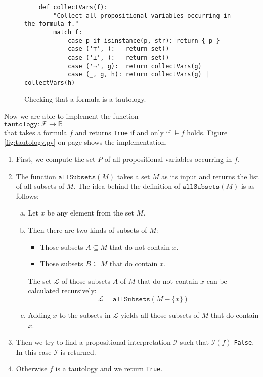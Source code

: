 \begin{figure}[!ht]
  \centering
\begin{verbatim}
    def collectVars(f):
        "Collect all propositional variables occurring in the formula f."
        match f:
            case p if isinstance(p, str): return { p }
            case ('⊤', ):   return set()
            case ('⊥', ):   return set()
            case ('¬', g):  return collectVars(g)
            case (_, g, h): return collectVars(g) | collectVars(h) 
\end{verbatim}
\vspace*{-0.3cm}
  \caption{Checking that a formula is a tautology.}
  \label{fig:tautology.py-collectVars}
\end{figure}

Now we are able to implement the function 
\\[0.2cm]
\hspace*{1.3cm}
$\mathtt{tautology}: \mathcal{F} \rightarrow \mathbb{B}$
\\[0.2cm]
that takes a formula $f$ and returns \texttt{True} if and only if $\models f$ holds.
Figure \ref{fig:tautology.py} on page \pageref{fig:tautology.py}
shows the implementation.
\begin{enumerate}
\item First, we compute the set $P$ of all propositional variables occurring in $f$.
\item The function $\mathtt{allSubsets}(M)$ takes a set $M$ as its input and returns the list of all subsets of $M$.
      The idea behind the definition of $\mathtt{allSubsets}(M)$ is as follows:
      \begin{enumerate}[(a)]
      \item Let $x$ be any element from the set $M$. 
      \item Then there are two kinds of subsets of $M$:
        \begin{itemize}
        \item Those subsets $A \subseteq M$ that do not contain $x$.
        \item Those subsets $B \subseteq M$ that do contain $x$.
      \end{itemize}
      The set $\mathcal{L}$ of those subsets $A$ of $M$ that do not contain $x$ can be calculated recursively:
      $$ \mathcal{L} = \texttt{allSubsets}(M - \{x\}) $$
      \item Adding $x$ to the subsets in $\mathcal{L}$ yields all those subsets of $M$ that do contain $x$. 
      \end{enumerate}  
\item Then we try to find a propositional interpretation $\mathcal{I}$ such that $\mathcal{I}(f)$
      \texttt{False}.  In this case $\mathcal{I}$ is returned. 
\item Otherwise $f$ is a tautology and we return \texttt{True}.
\end{enumerate}

